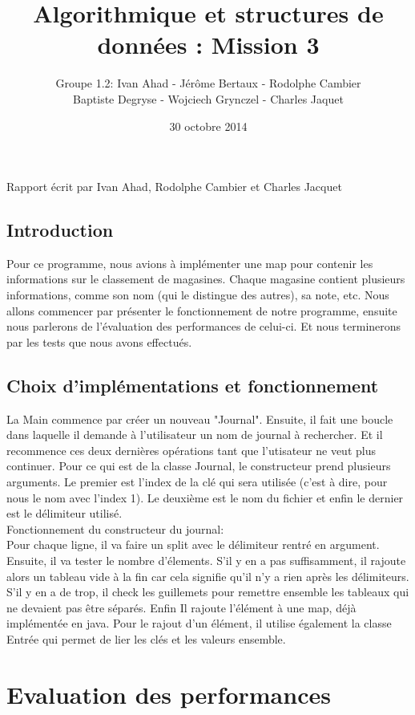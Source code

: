 \documentclass[a4paper]{article}
\title{Algorithmique et structures de données : Mission 3}
\date{30 octobre 2014}
\author{Groupe 1.2: Ivan Ahad - Jérôme Bertaux - Rodolphe Cambier \\ 
	Baptiste Degryse - Wojciech Grynczel - Charles Jaquet}
\begin{document}
\maketitle



Rapport écrit par Ivan Ahad, Rodolphe Cambier et Charles Jacquet

\subsection*{Introduction}
Pour ce programme, nous avions à implémenter une map pour contenir les informations sur le classement de magasines. Chaque magasine contient plusieurs informations, comme son nom (qui le distingue des autres), sa note, etc.
Nous allons commencer par présenter le fonctionnement de notre programme, ensuite nous parlerons de l'évaluation des performances de celui-ci. Et nous terminerons par les tests que nous avons effectués.

\subsection*{Choix d'implémentations et fonctionnement}
La Main commence par créer un nouveau "Journal". Ensuite, il fait une boucle dans laquelle il demande à l'utilisateur un nom de journal à rechercher.
Et il recommence ces deux dernières opérations tant que l'utisateur ne veut plus continuer.
Pour ce qui est de la classe Journal, le constructeur prend plusieurs arguments. Le premier est l'index de la clé qui sera utilisée (c'est à dire, pour nous le nom avec l'index 1). Le deuxième est le nom du fichier et enfin le dernier est le délimiteur utilisé.\\
Fonctionnement du constructeur du journal:\\
Pour chaque ligne, il va faire un split avec le délimiteur rentré en argument. Ensuite, il va tester le nombre d'élements. S'il y en a pas suffisamment,  il rajoute alors un tableau vide à la fin car cela signifie qu'il n'y a rien après les délimiteurs. S'il y en a de trop, il check les guillemets pour remettre ensemble les tableaux qui ne devaient pas être séparés. Enfin Il rajoute l'élément à une map, déjà implémentée en java. Pour le rajout d'un élément, il utilise également la classe Entrée qui permet de lier les clés et les valeurs ensemble.

\section*{Evaluation des performances}
\\
\end{document}

